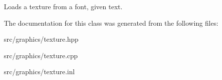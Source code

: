 Loads a texture from a font, given text. 

The documentation for this class was generated from the following files\+:\begin{DoxyCompactItemize}
\item 
src/graphics/texture.\+hpp\item 
src/graphics/texture.\+cpp\item 
src/graphics/texture.\+inl\end{DoxyCompactItemize}
